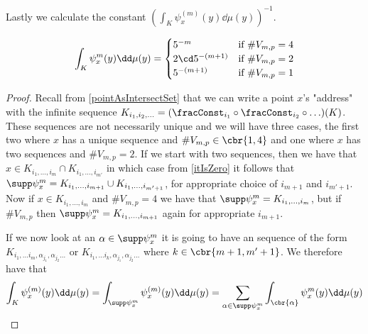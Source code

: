 Lastly we calculate the constant $\left(\int_{K} \psi_{x}^{(m)}(y) \dd \mu(y)\right)^{-1}$. 
\begin{lemma}
	\begin{equation}
		\int_{K} \psi_{x}^{m}(y) \dd \mu(y) = \begin{cases}
			5^{-m} & \text{if } \# V_{m,p} = 4 \\
			2\cd 5^{-(m+1)} & \text{if } \# V_{m,p} = 2 \\
			5^{-(m+1)}  & \text{if } \# V_{m,p} = 1
		\end{cases}
	\end{equation}
\end{lemma}

\begin{proof}
Recall from \cref{pointAsIntersectSet} that we can write a point $x$'s "address" with the infinite sequence $K_{i_1, i_2, \ldots} = (\fracConst_{i_1} \circ \fracConst_{i_2} \circ \ldots)(K)$. These sequences are not necessarily unique and we will have three cases, the first two where $x$ has a unique sequence and $\# V_{m,p} \in \cbr{1,4}$ and one where $x$ has two sequences and $\# V_{m, p} = 2$. If we start with two sequences, then we have that $x \in K_{i_1, \ldots, i_m} \cap K_{i_1, \ldots, i_{m'}}$ in which case from \cref{itIsZero} it follows that $\supp \psi_{x}^{m} = K_{i_1, \ldots, i_{m+1}} \cup K_{i_1, \ldots, i_{m'+1}}$, for appropriate choice of $i_{m+1}$ and $i_{m'+1}$. Now if $x\in K_{i_1, \ldots, i_m}$ and $\# V_{m,p} = 4$ we have that $\supp\psi_{x}^{m} = K_{i_1, \ldots, i_m}$, but if $\# V_{m,p}$ then $\supp\psi_{x}^{m} = K_{i_1, \ldots, i_{m+1}}$ again for appropriate $i_{m+1}$.

If we now look at an $\alpha \in \supp \psi_x^{m}$ it is going to have an sequence of the form $K_{i_1, \ldots i_m, \alpha_{j_1}, \alpha_{j_2} \ldots}$ or $K_{i_1, \ldots i_k, \alpha_{j_1}, \alpha_{j_2} \ldots}$ where $k \in \cbr{m+1, m'+1}$. We therefore have that
\begin{equation}
	\int_{K} \psi_{x}^{(m)}(y) \dd \mu(y) = \int_{\supp \psi_{x}^{m}} \psi_{x}^{(m)}(y) \dd \mu(y) = \sum_{\alpha \in \supp \psi_{x}^{m}} \int_{\cbr{\alpha}} \psi_{x}^{m}(y) \dd \mu(y)
\end{equation}
 

\end{proof}
